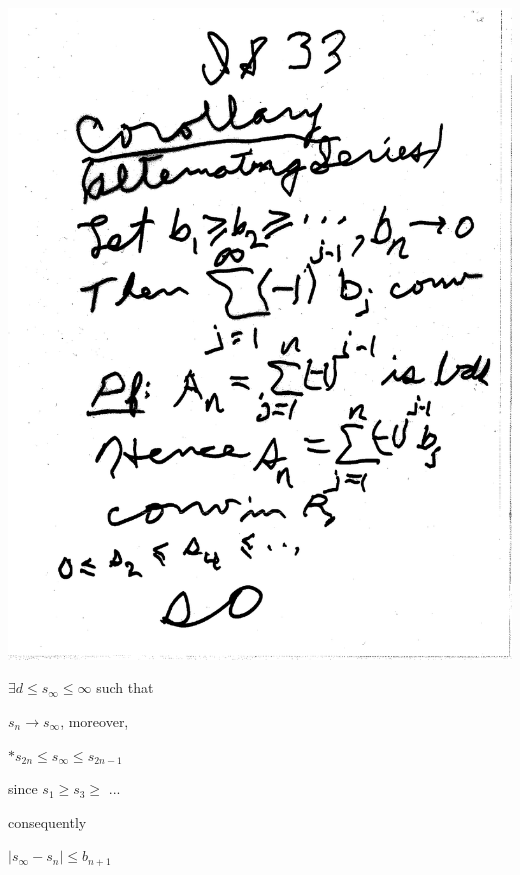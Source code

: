 \documentclass[10pt,a4paper]{article}
\begin{document}
{{\includegraphics[scale=.42]{Pages/IS_33}


\newpage

$\exists d \leq s_\infty \le \infty$ such that

$s_n \rightarrow s_\infty$, moreover, 

$*s_{2n} \leq s_\infty \leq s_{2n-1}$

since $s_1 \geq s_3 \geq$ ...

consequently 

$|s_\infty - s_n| \leq b_{n+1}$

}}
\end{document}
